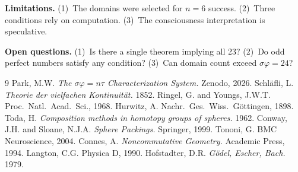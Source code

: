 \documentclass[11pt,a4paper]{article}
\begin{document}
\textbf{Limitations.} (1)~The domains were selected for $n=6$ success. (2)~Three conditions rely on computation. (3)~The consciousness interpretation is speculative.

\textbf{Open questions.} (1)~Is there a single theorem implying all 23? (2)~Do odd perfect numbers satisfy any condition? (3)~Can domain count exceed $\sigma\varphi = 24$?

\begin{thebibliography}{9}
 Park, M.W. \emph{The $\sigma\varphi=n\tau$ Characterization System.} Zenodo, 2026.
 Schl\"afli, L. \emph{Theorie der vielfachen Kontinuit\"at.} 1852.
 Ringel, G. and Youngs, J.W.T. Proc.\ Natl.\ Acad.\ Sci., 1968.
 Hurwitz, A. Nachr.\ Ges.\ Wiss.\ G\"ottingen, 1898.
 Toda, H. \emph{Composition methods in homotopy groups of spheres.} 1962.
 Conway, J.H. and Sloane, N.J.A. \emph{Sphere Packings.} Springer, 1999.
 Tononi, G. BMC Neuroscience, 2004.
 Connes, A. \emph{Noncommutative Geometry.} Academic Press, 1994.
 Langton, C.G. Physica D, 1990.
 Hofstadter, D.R. \emph{G\"odel, Escher, Bach.} 1979.
\end{thebibliography}
\end{document}
